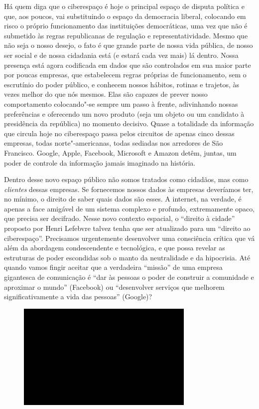 Há quem diga que o ciberespaço é hoje o principal espaço de disputa
política e que, aos poucos, vai substituindo o espaço da democracia
liberal, colocando em risco o próprio funcionamento das instituições
democráticas, uma vez que não é submetido às regras republicanas de
regulação e representatividade. Mesmo que não seja o nosso desejo,
o fato é que grande parte de nossa vida pública, de nosso ser social e
de nossa cidadania está (e estará cada vez mais) lá dentro. Nossa
presença está agora codificada em dados que são controlados em sua maior
parte por poucas empresas, que estabelecem regras próprias de
funcionamento, sem o escrutínio do poder público, e conhecem nossos
hábitos, rotinas e trajetos, às vezes melhor do que nós mesmos. Elas são
capazes de prever nosso comportamento colocando"-se sempre um passo à
frente, adivinhando nossas preferências e oferecendo um novo
produto (seja um objeto ou um candidato à presidência da república) no
momento decisivo. Quase a totalidade da informação que circula hoje no
ciberespaço passa pelos circuitos de apenas cinco dessas empresas, todas
norte"-americanas, todas sediadas nos arredores de São Francisco. Google,
Apple, Facebook, Microsoft e Amazon detêm, juntas, um poder de controle
da informação jamais imaginado na história.

Dentro desse novo espaço público não somos tratados como cidadãos, mas
como \emph{clientes} dessas empresas. Se fornecemos nossos dados às
empresas deveríamos ter, no mínimo, o direito de saber quais dados são
esses. A internet, na verdade, é apenas a face amigável de um sistema
complexo e profundo, extremamente opaco, que precisa ser decifrado.
Nesse novo contexto espacial, o ``direito à cidade'' proposto por Henri
Lefebvre talvez tenha que ser atualizado para um ``direito ao
ciberespaço''. Precisamos urgentemente desenvolver uma consciência
crítica que vá além da abordagem condescendente e tecnológica, e que
possa revelar as estruturas de poder escondidas sob o manto da
neutralidade e da hipocrisia. Até quando vamos fingir aceitar que a
verdadeira ``missão'' de uma empresa gigantesca de comunicação é ``dar
às pessoas o poder de construir a comunidade e aproximar o mundo''
(Facebook) ou ``desenvolver serviços que melhorem significativamente a
vida das pessoas'' (Google)?

\begin{figure}[!ht]
\centering
 \includegraphics[width=85mm]{./imgs/im1.jpg}
\caption{\tiny{}}
\end{figure}

